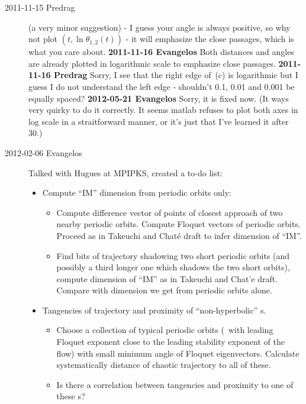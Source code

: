 \begin{description}
\item[2011-11-15 Predrag] (a very minor suggestion) - I guess your angle
  is always positive, so why not plot $(t,\ln \theta_{1,2}(t))$ - it will
  emphasize the close passages, which is what you care about.
  {\bf 2011-11-16 Evangelos} Both distances and angles are already plotted
  in logarithmic scale to emphasize close passages.
  {\bf 2011-11-16 Predrag}
  Sorry, I see that the right edge of \,(c) is logarithmic
  but I guess I do not understand the left edge - shouldn't 0.1, 0.01 and 0.001
  be equally spaced? {\bf 2012-05-21 Evangelos} Sorry, it is fixed now.
  (It ways very quirky to do it correctly. It seems matlab refuses to
  plot both axes in log scale in a straitforward manner,
  or it's just that I've learned it after 30.)

\item[2012-02-06 Evangelos] Talked with Hugues at MPIPKS, created a to-do list:
  \begin{itemize}
  \item Compute ``IM'' dimension from periodic orbits only:
    \begin{itemize}
    \item
      Compute difference vector of points of closest approach of two
      nearby periodic orbits. Compute Floquet vectors of periodic
      orbits. Proceed as in Takeuchi and Chat\'e draft to infer
      dimension of ``IM''.
    \item
      Find bits of trajectory shadowing two short periodic orbits (and
      possibly a third longer one which shadows the two short orbits),
      compute dimension of ``IM'' as in Takeuchi and Chat'e draft.
      Compare with dimension we get from periodic orbits alone.
    \end{itemize}
  \item Tangencies of trajectory and proximity of ``non-hyperbolic'' \po s.
    \begin{itemize}
    \item
      Choose a collection of typical periodic orbits (\ie\ with leading
      Floquet exponent close to the leading stability exponent of the flow)
      with small minimum angle of Floquet eigenvectors. Calculate
      systematically distance of chaotic trajectory to all of these.
    \item
      Is there a correlation between tangencies and proximity to one of
      these \po s?
    \end{itemize}
  \end{itemize}


\end{description}
